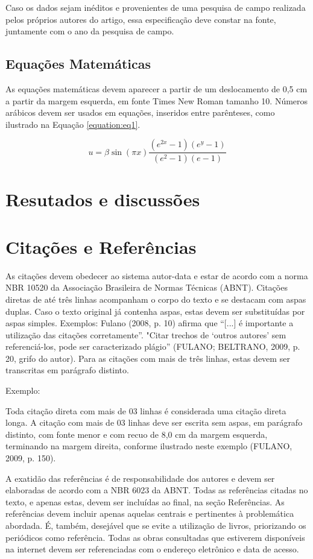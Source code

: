 \documentclass{modelo}
\begin{document}
Caso os dados sejam inéditos e provenientes de uma pesquisa de campo realizada pelos próprios autores do artigo, essa especificação deve constar na fonte, juntamente com o ano da pesquisa de campo.
  
 \subsection{Equações Matemáticas} 
 As equações matemáticas devem aparecer a partir de um deslocamento de 0,5 cm a partir da margem esquerda, em fonte Times New Roman tamanho 10. Números arábicos devem ser usados em equações, inseridos entre parênteses, como ilustrado na Equação \ref{equation:eq1}.  
  
  \begin{equation}
      u = \beta \sin{\left ( \pi x \right )}\frac{\left ( e^{2x}-1 \right ) \left ( e^{y}-1 \right )}{\left ( e^{2}-1 \right ) \left ( e-1 \right )} 
      \label{equation:eq1}
  \end{equation} 
   
 
 \section{Resutados e discussões}
 \section{Citações e Referências} 
 
As citações devem obedecer ao sistema autor-data e estar de acordo com a norma NBR 10520 da Associação Brasileira de Normas Técnicas (ABNT).
Citações diretas de até três linhas acompanham o corpo do texto e se destacam com aspas duplas. Caso o texto original já contenha aspas, estas devem ser substituídas por aspas simples. Exemplos:
Fulano (2008, p. 10) afirma que “[...] é importante a utilização das citações corretamente”.
"Citar trechos de ‘outros autores’ sem referenciá-los, pode ser caracterizado plágio” (FULANO; BELTRANO, 2009, p. 20, grifo do autor).
Para as citações com mais de três linhas, estas devem ser transcritas em parágrafo distinto.  

Exemplo:

\begin{citacao}
Toda citação direta com mais de 03 linhas é considerada uma citação direta longa. A citação com mais de 03 linhas deve ser escrita sem aspas, em parágrafo distinto, com fonte menor e com recuo de 8,0 cm da margem esquerda, terminando na margem direita, conforme ilustrado neste exemplo (FULANO, 2009, p. 150). 
\end{citacao}
A exatidão das referências é de responsabilidade dos autores e devem ser elaboradas de acordo com a NBR 6023 da ABNT.
Todas as referências citadas no texto, e apenas estas, devem ser incluídas ao final, na seção Referências.
As referências devem incluir apenas aquelas centrais e pertinentes à problemática abordada. É, também, desejável que se evite a utilização de livros, priorizando os periódicos como referência.
Todas as obras consultadas que estiverem disponíveis na internet devem ser referenciadas com o endereço eletrônico e data de acesso. 
\end{document}
